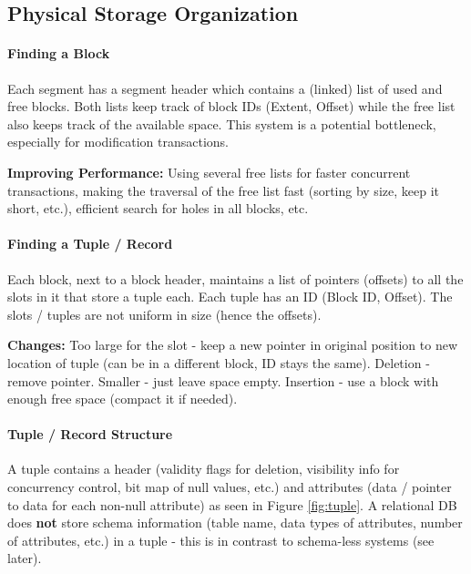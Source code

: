 \subsection{Physical Storage Organization}


\paragraph{Finding a Block}
Each segment has a segment header which contains a (linked) list of used and free blocks. Both lists keep track of block IDs (Extent, Offset) while the free list also keeps track of the available space. This system is a potential bottleneck, especially for modification transactions.

\textbf{Improving Performance:} Using several free lists for faster concurrent transactions, making the traversal of the free list fast (sorting by size, keep it short, etc.), efficient search for holes in all blocks, etc.

\paragraph{Finding a Tuple / Record}
Each block, next to a block header, maintains a list of pointers (offsets) to all the slots in it that store a tuple each. Each tuple has an ID (Block ID, Offset). The slots / tuples are not uniform in size (hence the offsets).

\textbf{Changes:} Too large for the slot - keep a new pointer in original position to new location of tuple (can be in a different block, ID stays the same). Deletion - remove pointer. Smaller - just leave space empty. Insertion - use a block with enough free space (compact it if needed).

\paragraph{Tuple / Record Structure}
A tuple contains a header (validity flags for deletion, visibility info for concurrency control, bit map of null values, etc.) and attributes (data / pointer to data for each non-null attribute) as seen in Figure \ref{fig:tuple}. A relational DB does \textbf{not} store schema information (table name, data types of attributes, number of attributes, etc.) in a tuple - this is in contrast to schema-less systems (see later).


